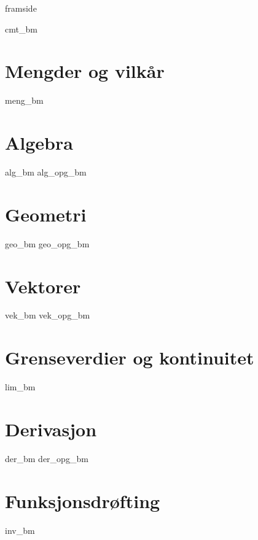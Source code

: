 



\addto\captionsenglish{\renewcommand{\figurename}{Figur}}
\makeatletter
\addto\captionsenglish{\renewcommand{\chaptername}{Kapittel}}
\addto\captionsenglish{\renewcommand{\contentsname}{Innhold}}


	
	{framside}
	
	{\footnotesize \tableofcontents}
	\newpage
	
	{cmt_bm}
	
	\chapter{Mengder og vilkår}
	\newpage
	{meng_bm}
	
	\chapter{Algebra}
	\newpage
	{alg_bm}
	{alg_opg_bm}
	
	\chapter{Geometri}
	\newpage
	{geo_bm}
	{geo_opg_bm}	
	
	\chapter{Vektorer}
	\newpage
	{vek_bm}
	{vek_opg_bm}	
		
	\chapter{Grenseverdier og kontinuitet}
	\newpage
	{lim_bm}	
	
	\chapter{Derivasjon} \label{Derivasjon}
	\newpage
	{der_bm}
	{der_opg_bm}	
	
	\chapter{Funksjonsdrøfting}
	\newpage
	{inv_bm}
	\titleformat{\chapter}[hang]
	{\normalfont\LARGE\bfseries}{}{}{\vspace{-1cm}\Huge}
